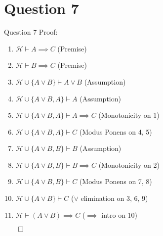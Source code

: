 \documentclass{beamer}
\begin{document}
    \section{Question 7}
    {
        \begin{frame}{Question 7}
            Proof:
            \begin{enumerate}
                \item $\mathcal{H} \vdash A \implies C$ (Premise)
                \item $\mathcal{H} \vdash B \implies C$ (Premise)
                \item $\mathcal{H} \cup \{A \lor B\} \vdash A \lor B$ (Assumption)
                \item $\mathcal{H} \cup \{A \lor B, A\} \vdash A$ (Assumption)
                \item $\mathcal{H} \cup \{A \lor B, A\} \vdash A \implies C$ (Monotonicity on 1)
                \item $\mathcal{H} \cup \{A \lor B, A\} \vdash C$ (Modus Ponens on 4, 5)
                \item $\mathcal{H} \cup \{A \lor B, B\} \vdash B$ (Assumption)
                \item $\mathcal{H} \cup \{A \lor B, B\} \vdash B \implies C$ (Monotonicity on 2)
                \item $\mathcal{H} \cup \{A \lor B, B\} \vdash C$ (Modus Ponens on 7, 8)
                \item $\mathcal{H} \cup \{A \lor B\} \vdash C$ ($\lor$ elimination on 3, 6, 9)
                \item $\mathcal{H} \vdash (A \lor B) \implies C$ ($\implies$ intro on 10)
            \end{enumerate}
            $\qed$
        \end{frame}
    }
\end{document}

